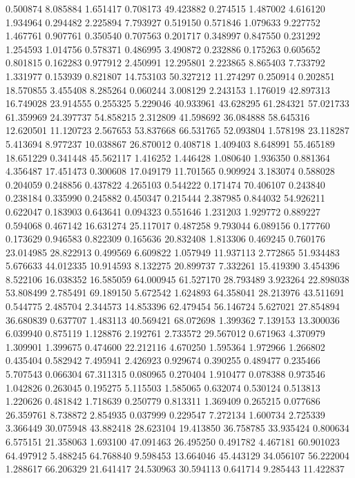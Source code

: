 0.500874
8.085884
1.651417
0.708173
49.423882
0.274515
1.487002
4.616120
1.934964
0.294482
2.225894
7.793927
0.519150
0.571846
1.079633
9.227752
1.467761
0.907761
0.350540
0.707563
0.201717
0.348997
0.847550
0.231292
1.254593
1.014756
0.578371
0.486995
3.490872
0.232886
0.175263
0.605652
0.801815
0.162283
0.977912
2.450991
12.295801
2.223865
8.865403
7.733792
1.331977
0.153939
0.821807
14.753103
50.327212
11.274297
0.250914
0.202851
18.570855
3.455408
8.285264
0.060244
3.008129
2.243153
1.176019
42.897313
16.749028
23.914555
0.255325
5.229046
40.933961
43.628295
61.284321
57.021733
61.359969
24.397737
54.858215
2.312809
41.598692
36.084888
58.645316
12.620501
11.120723
2.567653
53.837668
66.531765
52.093804
1.578198
23.118287
5.413694
8.977237
10.038867
26.870012
0.408718
1.409403
8.648991
55.465189
18.651229
0.341448
45.562117
1.416252
1.446428
1.080640
1.936350
0.881364
4.356487
17.451473
0.300608
17.049179
11.701565
0.909924
3.183074
0.588028
0.204059
0.248856
0.437822
4.265103
0.544222
0.171474
70.406107
0.243840
0.238184
0.335990
0.245882
0.450347
0.215444
2.387985
0.844032
54.926211
0.622047
0.183903
0.643641
0.094323
0.551646
1.231203
1.929772
0.889227
0.594068
0.467142
16.631274
25.117017
0.487258
9.793044
6.089156
0.177760
0.173629
0.946583
0.822309
0.165636
20.832408
1.813306
0.469245
0.760176
23.014985
28.822913
0.499569
6.609822
1.057949
11.937113
2.772865
51.934483
5.676633
44.012335
10.914593
8.132275
20.899737
7.332261
15.419390
3.454396
8.522106
16.038352
16.585059
64.000945
61.527170
28.793489
3.923264
22.898038
53.808499
2.785491
69.189150
5.672542
1.624893
64.358041
28.213976
43.511691
0.544775
2.485704
2.344573
14.853396
62.479454
56.146724
5.627021
27.854894
36.680839
0.637707
1.483113
40.569421
68.072698
1.399362
7.139153
13.300036
6.039940
0.875119
1.128876
2.192761
2.733572
29.567012
0.671963
4.370979
1.309901
1.399675
0.474600
22.212116
4.670250
1.595364
1.972966
1.266802
0.435404
0.582942
7.495941
2.426923
0.929674
0.390255
0.489477
0.235466
5.707543
0.066304
67.311315
0.080965
0.270404
1.910477
0.078388
0.973546
1.042826
0.263045
0.195275
5.115503
1.585065
0.632074
0.530124
0.513813
1.220626
0.481842
1.718639
0.250779
0.813311
1.369409
0.265215
0.077686
26.359761
8.738872
2.854935
0.037999
0.229547
7.272134
1.600734
2.725339
3.366449
30.075948
43.882418
28.623104
19.413850
36.758785
33.935424
0.800634
6.575151
21.358063
1.693100
47.091463
26.495250
0.491782
4.467181
60.901023
64.497912
5.488245
64.768840
9.598453
13.664046
45.443129
34.056107
56.222004
1.288617
66.206329
21.641417
24.530963
30.594113
0.641714
9.285443
11.422837
